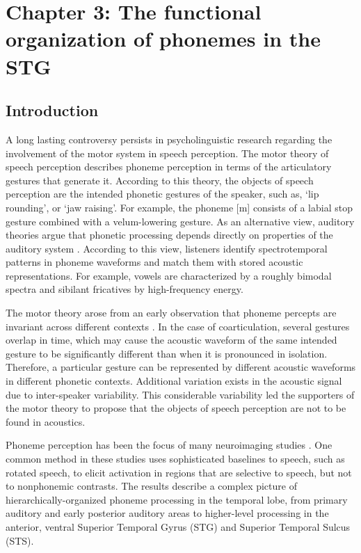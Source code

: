 \chapter{Chapter 3: The functional organization of phonemes in the STG}

\section{Introduction}
A long lasting controversy persists in psycholinguistic research regarding the involvement of the motor system in speech perception. The motor theory of speech perception \citep{liberman1967perception, liberman1985motor} describes phoneme perception in terms of the articulatory gestures that generate it. According to this theory, the objects of speech perception are the intended phonetic gestures of the speaker, such as, ‘lip rounding’, or ‘jaw raising’. For example, the phoneme [m] consists of a labial stop gesture combined with a velum-lowering gesture. As an alternative view, auditory theories argue that phonetic processing depends directly on properties of the auditory system \citep{jakobson1951preliminaries, stevens1972quantal, stevens1989quantal, stevens2002toward}. According to this view, listeners identify spectrotemporal patterns in phoneme waveforms and match them with stored acoustic representations. For example, vowels are characterized by a roughly bimodal spectra and sibilant fricatives by high-frequency energy.

The motor theory arose from an early observation that phoneme percepts are invariant across different contexts \citep{cooper1952some, liberman1967perception}. In the case of coarticulation, several gestures overlap in time, which may cause the acoustic waveform of the same intended gesture to be significantly different than when it is pronounced in isolation. Therefore, a particular gesture can be represented by different acoustic waveforms in different phonetic contexts. Additional variation exists in the acoustic signal due to inter-speaker variability.  This considerable variability led the supporters of the motor theory to propose that the objects of speech perception are not to be found in acoustics.

Phoneme perception has been the focus of many neuroimaging studies \citep{liebenthal2005neural, dehaene2005neural, mottonen2006perceiving, desai2008left, liebenthal2010specialization,  formisano2008saying, binder2000human, Dewitt2012}. One common method in these studies uses sophisticated baselines to speech, such as rotated speech, to elicit activation in regions that are selective to speech, but not to nonphonemic contrasts. The results describe a complex picture of hierarchically-organized phoneme processing in the temporal lobe, from primary auditory and early posterior auditory areas to higher-level processing in the anterior, ventral Superior Temporal Gyrus (STG) and Superior Temporal Sulcus (STS). 

